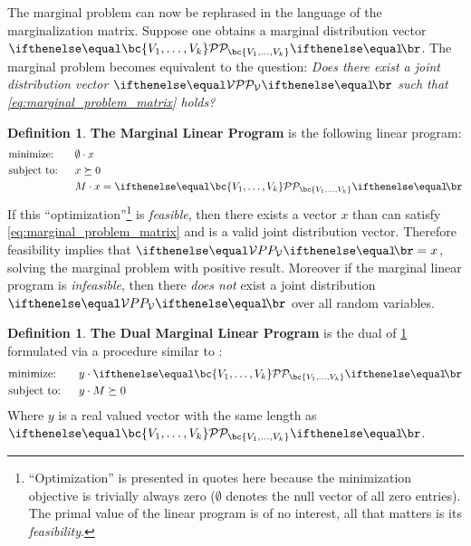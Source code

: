 \documentclass[aps, 10pt, english, twoside, pra, nofootinbib, longbibliography]{revtex4-1}
\theoremstyle{plain}
\theoremstyle{definition}
\newtheorem{definition}[theorem]{Definition}
\theoremstyle{remark}
\newcommand{\term}[1]{\textcolor{Mahogany}{\textbf{#1}}}
\begin{document}
    The marginal problem can now be rephrased in the language of the marginalization matrix. Suppose one obtains a marginal distribution vector $\probvec[\bc{V_1, \ldots, V_k}]$. The marginal problem becomes equivalent to the question: \textit{Does there exist a joint distribution vector $\probvec[\mathcal{V}]$ such that \cref{eq:marginal_problem_matrix} holds?}

    \begin{definition}
        \label{def:marginal_linear_program}
        \term{The Marginal Linear Program} is the following linear program:
        \begin{alignat*}{2}
            & \text{minimize:} \quad&& \emptyset \cdot x\\
            & \text{subject to:} && x \succeq 0 \\
            & && M \cdot x = \probvec[\bc{V_1, \ldots, V_k}]
        \end{alignat*}
        If this ``optimization''\footnote{``Optimization'' is presented in quotes here because the minimization objective is trivially always zero ($\emptyset$ denotes the null vector of all zero entries). The primal value of the linear program is of no interest, all that matters is its \textit{feasibility}.} is \textit{feasible}, then there exists a vector $x$ than can satisfy \cref{eq:marginal_problem_matrix} and is a valid joint distribution vector. Therefore feasibility implies that $\prob[\mathcal{V}] = x$, solving the marginal problem with positive result. Moreover if the marginal linear program is \textit{infeasible}, then there \textit{does not} exist a joint distribution $\prob[\mathcal{V}]$ over all random variables.
    \end{definition}
    \begin{definition}
        \label{def:dual_marginal_linear_program}
        \term{The Dual Marginal Linear Program} is the dual of \cref{def:marginal_linear_program} formulated via a procedure similar to \cite{Lahaie_2008}:
        \begin{alignat*}{2}
            & \text{minimize:} \quad&& y \cdot \probvec[\bc{V_1, \ldots, V_k}]\\
            & \text{subject to:} && y \cdot M \succeq 0
        \end{alignat*}
        Where $y$ is a real valued vector with the same length as $\probvec[\bc{V_1, \ldots, V_k}]$.
    \end{definition}
\end{document}
